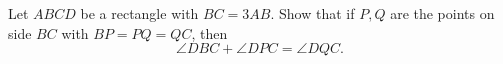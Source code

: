 Let $ABCD$ be a rectangle with $BC=3AB$. Show that if $P,Q$ are the points on side $BC$ with $BP = PQ = QC$,  then \[\angle DBC+\angle DPC = \angle DQC.\]